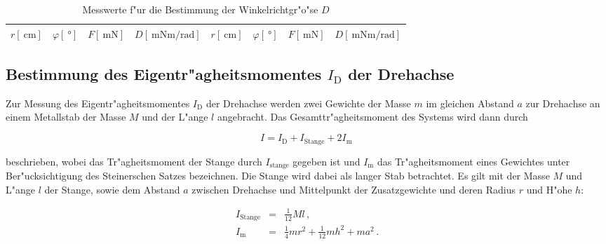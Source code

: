 		\begin{table}[h!]
			\begin{center}
				\caption{Messwerte f"ur die Bestimmung der Winkelrichtgr"o"se $D$ \label{tabelle:winkelrichtgroesse}}
				\begin{tabular}{|c|c|c|c||c|c|c|c|}
					\hline
					$r [\SI{}{\centi \meter}]$ & $\varphi [\SI{}{\degree}]$ &  $F [\SI{}{\milli \newton}]$ & $D \left[\SI{}{\milli \newton \meter \per \radian}\right]$ & $r [\SI{}{\centi \meter}]$ & $\varphi [\SI{}{\degree}]$ &  $F [\SI{}{\milli \newton}]$ & $D \left[\SI{}{\milli \newton \meter \per \radian}\right]$\\
					\hline 
					\hline
					
					\hline 
				\end{tabular}
			\end{center}
		\end{table}

	\subsection{Bestimmung des Eigentr"agheitsmomentes $I_\mathrm{D}$ der Drehachse}
	\label{subsec:eigentraegheitsmoment}
		Zur Messung des Eigentr"agheitsmomentes $I_\mathrm{D}$ der Drehachse werden zwei Gewichte der Masse $m$ im gleichen Abstand $a$ zur Drehachse an einem Metallstab der Masse $M$ und der L"ange $l$ angebracht.
		Das Gesamttr"agheitsmoment des Systems wird dann durch

		\begin{equation}
			I = I_\mathrm{D} + I_\mathrm{Stange} + 2 I_\mathrm{m} \, \label{eqn:gesamtmoment}
		\end{equation}

		beschrieben, wobei das Tr"agheitsmoment der Stange durch $I_\mathrm{stange}$ gegeben ist und $I_\mathrm{m}$ das Tr"agheitsmoment eines Gewichtes unter Ber"ucksichtigung des Steinerschen Satzes bezeichnen. 
		Die Stange wird dabei als langer Stab betrachtet.
		Es gilt mit der Masse $M$ und L"ange $l$ der Stange, sowie dem Abstand $a$ zwischen Drehachse und Mittelpunkt der Zusatzgewichte und deren Radius $r$ und H"ohe $h$:

		\begin{eqnarray*}
			I_\mathrm{Stange} & = & \frac{1}{12} M l \,, \\
			I_\mathrm{m} & = & \frac{1}{4}mr^2 + \frac{1}{12}mh^2 + ma^2 \,.
		\end{eqnarray*}

